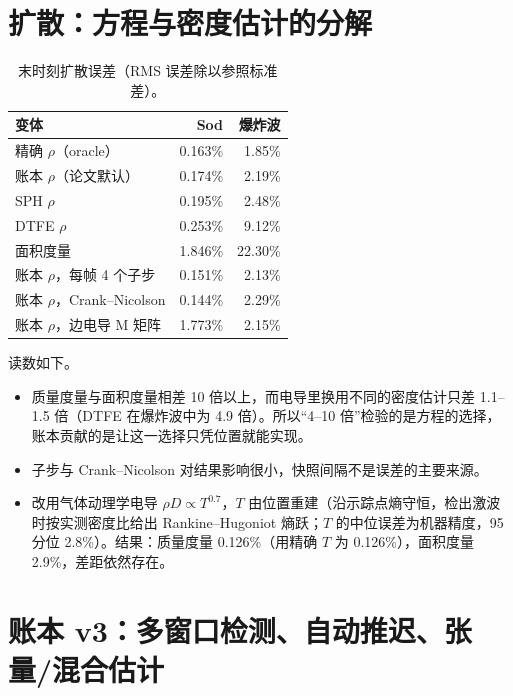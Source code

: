 \section{扩散：方程与密度估计的分解}
\begin{table}[!htbp]\centering\small\caption{末时刻扩散误差（RMS 误差除以参照标准差）。}
\begin{tabularx}{0.8\linewidth}{@{}L r r@{}}\toprule
变体 & Sod & 爆炸波\\\midrule
精确 $\rho$（oracle） & 0.163\% & 1.85\%\\
账本 $\rho$（论文默认） & 0.174\% & 2.19\%\\
SPH $\rho$ & 0.195\% & 2.48\%\\
DTFE $\rho$ & 0.253\% & 9.12\%\\
面积度量 & 1.846\% & 22.30\%\\
账本 $\rho$，每帧 4 个子步 & 0.151\% & 2.13\%\\
账本 $\rho$，Crank–Nicolson & 0.144\% & 2.29\%\\
账本 $\rho$，边电导 M 矩阵 & 1.773\% & 2.15\%\\
\bottomrule\end{tabularx}\end{table}
读数如下。
\begin{itemize}
\item 质量度量与面积度量相差 10 倍以上，而电导里换用不同的密度估计只差 1.1–1.5 倍（DTFE 在爆炸波中为 4.9 倍）。所以“4–10 倍”检验的是方程的选择，账本贡献的是让这一选择只凭位置就能实现。
\item 子步与 Crank–Nicolson 对结果影响很小，快照间隔不是误差的主要来源。
\item 改用气体动理学电导 $\rho D\propto T^{0.7}$，$T$ 由位置重建（沿示踪点熵守恒，检出激波时按实测密度比给出 Rankine–Hugoniot 熵跃；$T$ 的中位误差为机器精度，95 分位 2.8\%）。结果：质量度量 0.126\%（用精确 $T$ 为 0.126\%），面积度量 2.9\%，差距依然存在。
\end{itemize}

\section{账本 v3：多窗口检测、自动推迟、张量/混合估计}
